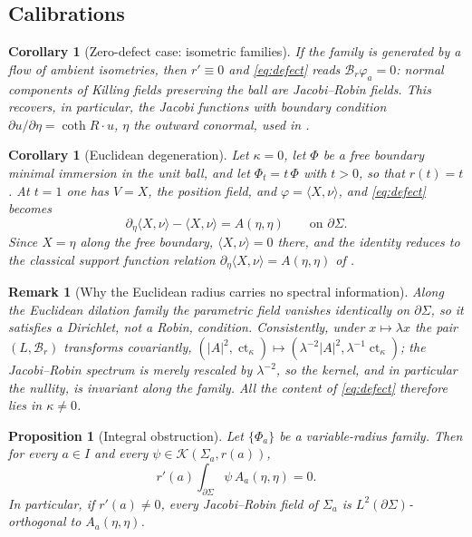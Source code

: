 \documentclass[10pt,a4paper]{amsart}
\newtheorem{proposition}[theorem]{Proposition}
\newtheorem{corollary}[theorem]{Corollary}
\newtheorem{remark}[theorem]{Remark}
\newcommand{\ct}{\operatorname{ct}_\kappa}
\newcommand{\Ker}{\mathcal{K}}
\begin{document}
\subsection*{Calibrations}

\begin{corollary}[Zero-defect case: isometric families]\label{cor:killing}
If the family is generated by a flow of ambient isometries, then $r'\equiv 0$ and \eqref{eq:defect} reads $\mathcal{B}_{r}\varphi_a=0$: normal components of Killing fields preserving the ball are Jacobi--Robin fields. This recovers, in particular, the Jacobi functions with boundary condition $\partial u/\partial\eta=\coth R\cdot u$, $\eta$ the outward conormal, used in \cite[eq. (26)]{LX18}.
\end{corollary}

\begin{corollary}[Euclidean degeneration]\label{cor:euclid}
Let $\kappa=0$, let $\Phi$ be a free boundary minimal immersion in the unit ball, and let $\Phi_t=t\,\Phi$ with $t>0$, so that $r(t)=t$. At $t=1$ one has $V=X$, the position field, and $\varphi=\langle X,\nu\rangle$, and \eqref{eq:defect} becomes
\[
\partial_\eta\langle X,\nu\rangle-\langle X,\nu\rangle=A(\eta,\eta)\qquad\text{on }\partial\Sigma.
\]
Since $X=\eta$ along the free boundary, $\langle X,\nu\rangle=0$ there, and the identity reduces to the classical support function relation $\partial_\eta\langle X,\nu\rangle=A(\eta,\eta)$ of \cite{FS16,AN16,Dev19,Tra20}.
\end{corollary}

\begin{remark}[Why the Euclidean radius carries no spectral information]\label{rem:scaling}
Along the Euclidean dilation family the parametric field vanishes identically on $\partial\Sigma$, so it satisfies a Dirichlet, not a Robin, condition. Consistently, under $x\mapsto\lambda x$ the pair $(L,\mathcal{B}_r)$ transforms covariantly, $(|A|^2,\ct)\mapsto(\lambda^{-2}|A|^2,\lambda^{-1}\ct)$; the Jacobi--Robin spectrum is merely rescaled by $\lambda^{-2}$, so the kernel, and in particular the nullity, is invariant along the family. All the content of \eqref{eq:defect} therefore lies in $\kappa\neq 0$.
\end{remark}

\begin{proposition}[Integral obstruction]\label{prop:pairing}
Let $\{\Phi_a\}$ be a variable-radius family. Then for every $a\in I$ and every $\psi\in\Ker(\Sigma_a,r(a))$,
\begin{equation}\label{eq:pairing}
r'(a)\int_{\partial\Sigma}\psi\,A_a(\eta,\eta)=0 .
\end{equation}
In particular, if $r'(a)\neq 0$, every Jacobi--Robin field of $\Sigma_a$ is $L^2(\partial\Sigma)$-orthogonal to $A_a(\eta,\eta)$.
\end{proposition}
\end{document}
